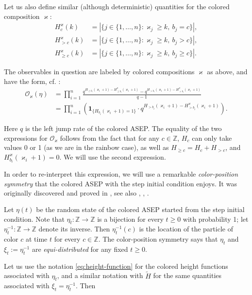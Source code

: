 \documentclass[11pt,reqno]{amsart}
\theoremstyle{definition}
\theoremstyle{remark}
\theoremstyle{remark}
\def\geq{\geqslant}
\renewcommand\ge{\geq}
\def\O{\mathcal{O}}
\def\Z{\mathbb Z}
\numberwithin{equation}{section}
\begin{document}
	Let us also define similar (although deterministic) quantities for the colored composition $\varkappa$:
	\begin{align*}
		H^\varkappa_c(k)&=\left|\{j\in\{1,\dots,n\}:\varkappa_j\ge k,\ b_j=c\}\right|, \\ H^\varkappa_{>c}(k)&=\left|\{j\in\{1,\dots,n\}:\varkappa_j\ge k,\ b_j>c\}\right|,\\
		H^\varkappa_{\ge c}(k)&=\left|\{j\in\{1,\dots,n\}:\varkappa_j\ge k,\ b_j\ge c\}\right|.
	\end{align*}
	
	The observables in question are labeled by colored compositions $\varkappa$ as above, and have the form, cf. \cite[Section 6.4]{BW-observables}:
	\begin{align*}
		\O_\varkappa (\eta) &= 
		\prod_{i=1}^n 
		\frac
		{q^{H_{\ge b_i}(\varkappa_i+1)-H_{\ge b_i}^\varkappa(\varkappa_i+1)}-q^{H_{>b_i}(\varkappa_i+1)-H_{>b_i}^\varkappa(\varkappa_i+1)}}{q-1}
		\\&=
		\prod_{i=1}^n \left(\mathbf{1}_{\{H_{b_i}(\varkappa_i+1)=1\}} \cdot q^{H_{>b_i}(\varkappa_i+1)-H_{>b_i}^\varkappa(\varkappa_i+1)}\right).  
	\end{align*}
	
	Here $q$ is the left jump rate of the colored ASEP. 
	The equality of the two expressions for $\O_\varkappa$ follows from the fact that for any $c\in\Z$, $H_c$ can only take values 0 or 1 (as we are in the rainbow case), as well as $H_{\ge c}=H_c+H_{>c}$, and $H_{b_i}^\varkappa(\varkappa_i+1)=0$. We will use the second expression. 
	
	In order to re-interpret this expression, we will use a remarkable \emph{color-position symmetry} that the colored ASEP with the step initial condition enjoys. It was originally discovered and proved in \cite{AAV}, see also \cite{BW-coloured}, \cite{BB}, \cite{Buf}. 
	
	Let $\eta(t)$ be the random state of the colored ASEP started from the step initial condition. Note that $\eta_t:\Z\to\Z$ is a bijection for every $t\ge 0$ with probability 1; let $\eta^{-1}_t:\Z\to\Z$ denote its inverse. Then $\eta_t^{-1}(c)$ is the location of the particle of color $c$ at time $t$ for every $c\in\Z$. The color-position symmetry says that $\eta_t$ and $\xi_t:=\eta_t^{-1}$ are \emph{equi-distributed} for any fixed $t\ge 0$.   
	
	Let us use the notation \eqref{eq:height-function} for the colored height functions associated with $\eta_t$, and a similar notation with $\widetilde H$ for the same quantities associated with $\xi_t=\eta_t^{-1}$. Then
	
\end{document}
